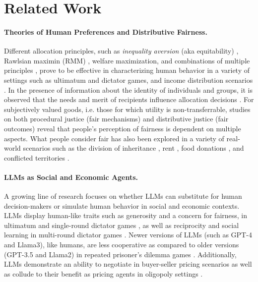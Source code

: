 \section{Related Work}
\paragraph{Theories of Human Preferences and Distributive Fairness.}
Different allocation principles, such as \textit{inequality aversion} (aka equitability) \citep{F&S00,B&O00}, Rawlsian maximin (RMM) \citep{RawlsTOJ}, welfare maximization, and combinations of multiple principles \citep{C&R02}, prove to be effective in characterizing human behavior in a variety of settings such as ultimatum and dictator games, and income distribution scenarios \citep{Frohlich87,KRITIKOS2001,E&S04}. In the presence of information about the identity of individuals and groups, it is observed that the needs and merit of recipients influence allocation decisions \citep{Konow03,Overlaet1991,Gaertner200}. For subjectively valued goods, i.e. those for which utility is non-transferrable, studies on both procedural justice (fair mechanisms) \citep{KYROPOULOU202228,Schnieder04,dupuis2011simpler} and distributive justice (fair outcomes) \citep{H&P07,HP10,Gates2020} reveal that people's perception of fairness is dependent on multiple aspects. What people consider fair has also been explored in a variety of real-world scenarios such as the division of inheritance \citep{Pratt90}, rent \citep{gal2016rent}, food donations \citep{LeeFR17,LeeWBAI19}, and conflicted territories \citep{BramsSpratly,BramsDavid,Massoud02}. 

\paragraph{LLMs as Social and Economic Agents.}
A growing line of research focuses on whether LLMs can substitute for human decision-makers \citep{raman2024rationality,zhang2024llm, scherrer2024evaluating} or simulate human behavior \citep{CharnessLLM2023,gui2023challenge,goli2023can} in social and economic contexts. LLMs display human-like traits such as generosity and a concern for fairness, in ultimatum \citep{ross2024llm,MeiTuring24,AherICML} and single-round dictator games \citep{horton2023large}, as well as reciprocity and social learning in multi-round dictator games \citep{leng2023llm}. 
Newer versions of LLMs (such as GPT-4 and Llama3), like humans, are less cooperative as compared to older versions (GPT-3.5 and Llama2) in repeated prisoner's dilemma games \citep{akata2023playing,guo2023gpt,fontana2024nicer}. Additionally, LLMs demonstrate an ability to negotiate in buyer-seller pricing scenarios \citep{bianchi2024well} as well as collude to their benefit as pricing agents in oligopoly settings \citep{fish2024algorithmic}. 

